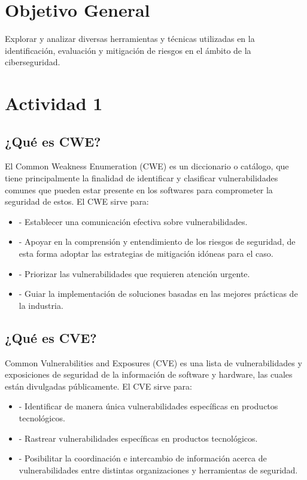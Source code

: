 \documentclass[stu, 11pt, letterpaper, donotrepeattitle, floatsintext, natbib]{apa7}
\begin{document}
\newpage

\section{\large Objetivo General}

Explorar y analizar diversas herramientas y técnicas utilizadas en la identificación, evaluación y mitigación de riesgos en el ámbito de la ciberseguridad. 

\newpage

\section{\large Actividad 1}

\subsection{¿Qué es CWE?} 

El Common Weakness Enumeration (CWE) es un diccionario o catálogo, que tiene principalmente la finalidad de identificar y clasificar vulnerabilidades comunes que pueden estar presente en los softwares para comprometer la seguridad de estos. El CWE sirve para:

\begin{itemize}
\item[] - Establecer una comunicación efectiva sobre vulnerabilidades.
\item[] - Apoyar en la comprensión y entendimiento de los riesgos de seguridad, de esta forma adoptar las estrategias de mitigación idóneas para el caso.
\item[] - Priorizar las vulnerabilidades que requieren atención urgente.
\item[] - Guiar la implementación de soluciones basadas en las mejores prácticas de la industria.
\end{itemize}

\subsection{¿Qué es CVE?} 

Common Vulnerabilities and Exposures (CVE) es una lista de vulnerabilidades y exposiciones de seguridad de la información de software y hardware, las cuales están divulgadas públicamente. El CVE sirve para:

\begin{itemize}
\item[] - Identificar de manera única vulnerabilidades específicas en productos tecnológicos.
\item[] - Rastrear vulnerabilidades específicas en productos tecnológicos.
\item[] - Posibilitar la coordinación e intercambio de información acerca de vulnerabilidades entre distintas organizaciones y herramientas de seguridad.
\end{itemize}
\end{document}
